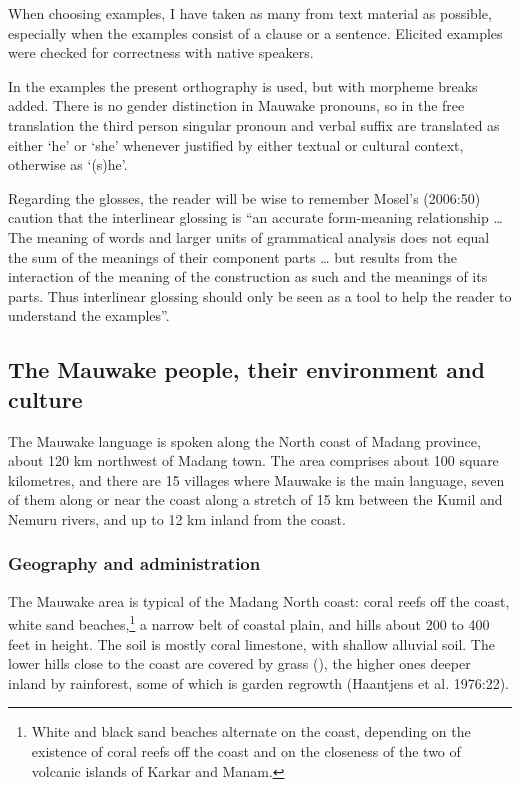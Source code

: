 When choosing examples, I have taken as many from text material as possible, especially when the examples consist of a clause or a sentence.  Elicited examples were checked for correctness with native speakers.

In the examples the present orthography is used, but with morpheme breaks added. There is no gender distinction in Mauwake pronouns, so in the free translation the third person singular pronoun and verbal suffix are translated as either `he' or `she' whenever justified by either textual or cultural context, otherwise as `(s)he'. 

Regarding the glosses, the reader will be wise to remember Mosel's (2006:50) caution that the interlinear glossing is  ``an accurate form-meaning relationship {\dots} The meaning of words and larger units of grammatical analysis does not equal the sum of the meanings of their component parts {\dots} but results from the interaction of the meaning of the construction as such and the meanings of its parts.  Thus interlinear glossing should only be seen as a tool to help the reader to understand the examples''. 

\subsection{The Mauwake people, their environment and culture}
\hypertarget{RefHeading18421935131865}{}The Mauwake language is spoken along the North coast of Madang province, about 120 km northwest of Madang town. The area comprises about 100 square kilometres, and there are 15 villages where Mauwake is the main language, seven of them along or near the coast along a stretch of 15 km between the Kumil and Nemuru rivers, and up to 12 km inland from the coast.

\subsubsection{Geography and administration} 
\hypertarget{RefHeading18441935131865}{}The Mauwake area is typical of the Madang North coast: coral reefs off the coast, white sand beaches,\footnote{White and black sand beaches alternate on the coast, depending on the existence of coral reefs off the coast and on the closeness of the two of volcanic islands of Karkar and Manam.} a narrow belt of coastal plain, and hills about 200 to 400 feet in height. The soil is mostly coral limestone, with shallow alluvial soil.  The lower hills close to the coast are covered by  grass (), the higher ones deeper inland by rainforest, some of which is garden regrowth (Haantjens et al. 1976:22). 

